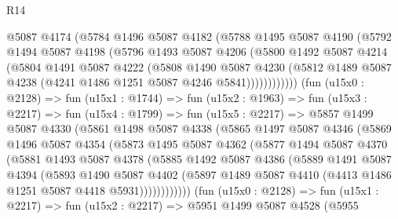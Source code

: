 \begin{lexlean}{R14}
\begin{coremodule}
              @5087
              @4174
              (@5784
                @1496
                @5087
                @4182
                (@5788
                  @1495
                  @5087
                  @4190
                  (@5792
                    @1494
                    @5087
                    @4198
                    (@5796
                      @1493
                      @5087
                      @4206
                      (@5800
                        @1492
                        @5087
                        @4214
                        (@5804
                          @1491
                          @5087
                          @4222
                          (@5808
                            @1490
                            @5087
                            @4230
                            (@5812
                              @1489
                              @5087
                              @4238
                              (@4241 @1486 @1251 @5087 @4246 @5841))))))))))))
        (fun (u15x0 : @2128) =>
        fun (u15x1 : @1744) =>
        fun (u15x2 : @1963) =>
        fun (u15x3 : @2217) =>
        fun (u15x4 : @1799) =>
        fun (u15x5 : @2217) =>
        @5857
          @1499
          @5087
          @4330
          (@5861
            @1498
            @5087
            @4338
            (@5865
              @1497
              @5087
              @4346
              (@5869
                @1496
                @5087
                @4354
                (@5873
                  @1495
                  @5087
                  @4362
                  (@5877
                    @1494
                    @5087
                    @4370
                    (@5881
                      @1493
                      @5087
                      @4378
                      (@5885
                        @1492
                        @5087
                        @4386
                        (@5889
                          @1491
                          @5087
                          @4394
                          (@5893
                            @1490
                            @5087
                            @4402
                            (@5897
                              @1489
                              @5087
                              @4410
                              (@4413 @1486 @1251 @5087 @4418 @5931))))))))))))
        (fun (u15x0 : @2128) =>
        fun (u15x1 : @2217) =>
        fun (u15x2 : @2217) =>
        @5951
          @1499
          @5087
          @4528
          (@5955

\end{coremodule}
\end{lexlean}
